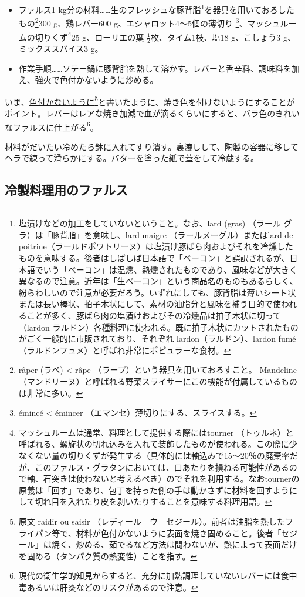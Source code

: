 \begin{recette}
\begin{itemize}
\item
  ファルス1 kg分の材料\ldots{}\ldots{}生のフレッシュな豚背脂\footnote{塩漬けなどの加工をしていないということ。なお、lard
    (gras) （ラール グラ）は「豚背脂」を意味し、lard maigre
    （ラールメーグル）またはlard de
    poitrine（ラールドポワトリーヌ）は塩漬け豚ばら肉およびそれを冷燻したものを意味する。後者はしばしば日本語で「ベーコン」と誤訳されるが、日本語でいう「ベーコン」は温燻、熱燻されたものであり、風味などが大きく異なるので注意。近年は「生ベーコン」という商品名のものもあるらしく、紛らわしいので注意が必要だろう。いずれにしても、豚背脂は薄いシート状または長い棒状、拍子木状にして、素材の油脂分と風味を補う目的で使われることが多く、豚ばら肉の塩漬けおよびその冷燻品は拍子木状に切って（lardon
    ラルドン）各種料理に使われる。既に拍子木状にカットされたものがごく一般的に市販されており、それぞれ
    lardon（ラルドン）、lardon
    fumé（ラルドンフュメ）と呼ばれ非常にポピュラーな食材。}を器具を用いておろしたもの\footnote{râper
    (ラペ) \textless{} râpe （ラープ）という器具を用いておろすこと。
    Mandeline
    （マンドリーヌ）と呼ばれる野菜スライサーにこの機能が付属しているものは非常に多い。}300
  g、鶏レバー600 g、エシャロット4〜5個の薄切り \footnote{émincé
    \textless{} émincer （エマンセ）薄切りにする、スライスする。}、マッシュルームの切りくず\footnote{マッシュルームは通常、料理として提供する際にはtourner
    （トゥルネ）と呼ばれる、螺旋状の切れ込みを入れて装飾したものが使われる。この際に少なくない量の切りくずが発生する（具体的には軸込みで15〜20％の廃棄率だが、このファルス・グラタンにおいては、口あたりを損ねる可能性があるので軸、石突きは使わないと考えるべき）のでそれを利用する。なおtournerの原義は「回す」であり、包丁を持った側の手は動かさずに材料を回すようにして切れ目を入れたり皮を剥いたりすることを意味する料理用語。}25
  g、ローリエの葉 \(\frac{1}{2}\)枚、タイム1枝、塩18 g、こしょう3
  g、ミックススパイス3 g。
\item
  作業手順\ldots{}\ldots{}ソテー鍋に豚背脂を熱して溶かす。レバーと香辛料、調味料を加え、強火で\ul{色付かないように}炒める。
\end{itemize}

いま、\ul{色付かないように}\footnote{原文 raidir ou saisir
  （レディール　ウ　セジール）。前者は油脂を熱したフライパン等で、材料が色付かないように表面を焼き固めること。後者「セジール」は焼く、炒める、茹でるなど方法は問わないが、熱によって表面だけを固める（タンパク質の熱変性）ことを指す。}と書いたように、焼き色を付けないようにすることがポイント。レバーはレアな焼き加減で血が滴るくらいにすると、バラ色のきれいなファルスに仕上がる\footnote{現代の衛生学的知見からすると、充分に加熱調理していないレバーには食中毒あるいは肝炎などのリスクがあるので注意。}。

材料がだいたい冷めたら鉢に入れてすり潰す。裏漉しして、陶製の容器に移してヘラで練って滑らかにする。バターを塗った紙で蓋をして冷蔵する。
\end{recette}
\hypertarget{farce-pour-les-pieces-froides}{%
\subsection{冷製料理用のファルス}\label{farce-pour-les-pieces-froides}}

